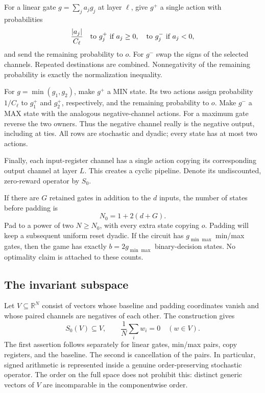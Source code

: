 \documentclass[11pt,letterpaper]{article}
\theoremstyle{definition}
\theoremstyle{remark}
\newcommand{\R}{\mathbb R}
\begin{document}
For a linear gate $g=\sum_j a_jg_j$ at layer $\ell$, give $g^+$ a single
action with probabilities
\begin{equation}
 \frac{|a_j|}{C_\ell}
 \quad\hbox{to }g_j^+\text{ if }a_j\geq0,
 \quad\hbox{to }g_j^-\text{ if }a_j<0,
 \label{ste:ec:eq:linear-rail}
\end{equation}
and send the remaining probability to $o$. For $g^-$ swap the signs of the
selected channels. Repeated destinations are combined. Nonnegativity of
the remaining probability is exactly the normalization inequality.

For $g=\min(g_1,g_2)$, make $g^+$ a MIN state. Its two actions assign
probability $1/C_\ell$ to $g_1^+$ and $g_2^+$, respectively, and the
remaining probability to $o$. Make $g^-$ a MAX state with the analogous
negative-channel actions. For a maximum gate reverse the two owners.
Thus the negative channel really is the negative output, including at ties.
All rows are stochastic and dyadic; every state has at most two actions.

Finally, each input-register channel has a single action copying its
corresponding output channel at layer $L$. This creates a cyclic pipeline.
Denote its undiscounted, zero-reward operator by $S_0$.

If there are $G$ retained gates in addition to the $d$ inputs, the number
of states before padding is
\begin{equation}
 N_0=1+2(d+G).
 \label{ste:ec:eq:state-count}
\end{equation}
Pad to a power of two $N\geq N_0$, with every extra state copying $o$.
Padding will keep a subsequent uniform reset dyadic. If the circuit has
$g_{\min\max}$ min/max gates, then the game has exactly
$b=2g_{\min\max}$ binary-decision states. No optimality claim is attached
to these counts.

\subsection{The invariant subspace}

Let $V\subseteq\R^N$ consist of vectors whose baseline and padding
coordinates vanish and whose paired channels are negatives of each other.
The construction gives
\begin{equation}
 S_0(V)\subseteq V,\qquad \frac1N\sum_iw_i=0\quad(w\in V).
 \label{ste:ec:eq:dual-subspace}
\end{equation}
The first assertion follows separately for linear gates, min/max pairs,
copy registers, and the baseline. The second is cancellation of the pairs.
In particular, signed arithmetic is represented inside a genuine
order-preserving stochastic operator. The order on the full space does
not prohibit this: distinct generic vectors of $V$ are incomparable in
the componentwise order.
\end{document}
